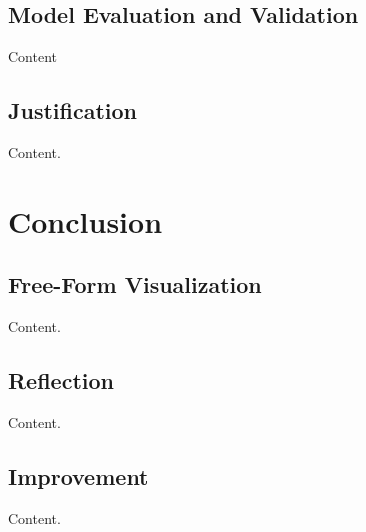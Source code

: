 \documentclass{article}
\begin{document}
\subsection{Model Evaluation and Validation}

Content

\subsection{Justification}

Content.

\section{Conclusion}

\subsection{Free-Form Visualization}

Content.

\subsection{Reflection}

Content.

\subsection{Improvement}

Content.




\end{document}
